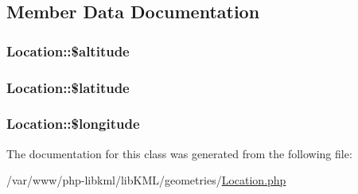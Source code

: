 \subsection{Member Data Documentation}
\hypertarget{classLocation_a03c33cc85a087617110571262132db60}{
\subsubsection[{\$altitude}]{\setlength{\rightskip}{0pt plus 5cm}Location::\$altitude}}
\label{da/d05/classLocation_a03c33cc85a087617110571262132db60}
\hypertarget{classLocation_ae15b3cd3b57a12528d55564c01ce03d2}{
\subsubsection[{\$latitude}]{\setlength{\rightskip}{0pt plus 5cm}Location::\$latitude}}
\label{da/d05/classLocation_ae15b3cd3b57a12528d55564c01ce03d2}
\hypertarget{classLocation_adfec0a0d3ff62df48fdb88cc0b560660}{
\subsubsection[{\$longitude}]{\setlength{\rightskip}{0pt plus 5cm}Location::\$longitude}}
\label{da/d05/classLocation_adfec0a0d3ff62df48fdb88cc0b560660}


The documentation for this class was generated from the following file:\begin{DoxyCompactItemize}
\item 
/var/www/php-\/libkml/libKML/geometries/\hyperlink{Location_8php}{Location.php}\end{DoxyCompactItemize}
